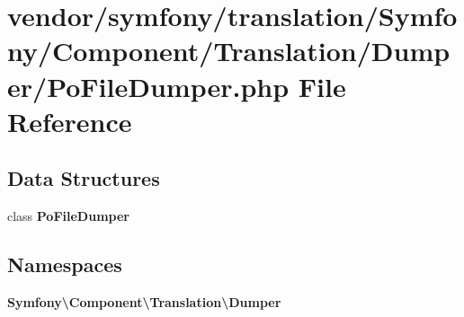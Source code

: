 \section{vendor/symfony/translation/\+Symfony/\+Component/\+Translation/\+Dumper/\+Po\+File\+Dumper.php File Reference}
\label{_po_file_dumper_8php}
\subsection*{Data Structures}
\begin{DoxyCompactItemize}
\item 
class {\bf Po\+File\+Dumper}
\end{DoxyCompactItemize}
\subsection*{Namespaces}
\begin{DoxyCompactItemize}
\item 
 {\bf Symfony\textbackslash{}\+Component\textbackslash{}\+Translation\textbackslash{}\+Dumper}
\end{DoxyCompactItemize}

